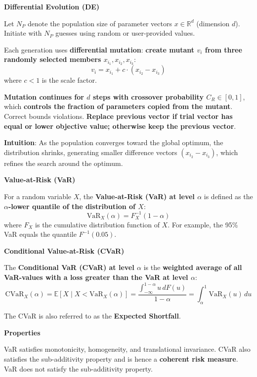 \documentclass[12pt,a4paper]{article}
\begin{document}
\vspace{0.5em}

\textbf{Differential Evolution (DE)}

Let $N_P$ denote the population size of parameter vectors $x \in \mathbb{R}^d$ (dimension $d$). Initiate with $N_P$ guesses using random or user-provided values.

Each generation uses \textbf{differential mutation}: \textbf{create mutant $v_i$ from three randomly selected members $x_{i_1}, x_{i_2}, x_{i_3}$}:
\[
v_i = x_{i_1} + c \cdot (x_{i_2} - x_{i_3})
\]
where $c < 1$ is the scale factor.

\textbf{Mutation continues for $d$ steps with crossover probability $C_R \in [0,1]$}, which \textbf{controls the fraction of parameters copied from the mutant}. Correct bounds violations. \textbf{Replace previous vector if trial vector has equal or lower objective value; otherwise keep the previous vector}.

\vspace{0.5em}

\textbf{Intuition}: As the population converges toward the global optimum, the distribution shrinks, generating smaller difference vectors $(x_{i_2} - x_{i_3})$, which refines the search around the optimum.

\vspace{0.5em}

\textbf{Value-at-Risk (VaR)}

For a random variable $X$, the \textbf{Value-at-Risk (VaR) at level $\alpha$} is defined as the \textbf{$\alpha$-lower quantile of the distribution of $X$}:
\[
\text{VaR}_X(\alpha) = F_X^{-1}(1 - \alpha)
\]
where $F_X$ is the cumulative distribution function of $X$. For example, the 95\% VaR equals the quantile $F^{-1}(0.05)$.

\textbf{Conditional Value-at-Risk (CVaR)}

The \textbf{Conditional VaR (CVaR) at level $\alpha$} is the \textbf{weighted average of all VaR-values with a loss greater than the VaR at level $\alpha$}:
\[
\text{CVaR}_X(\alpha) = \mathbb{E}[X \mid X < \text{VaR}_X(\alpha)] = \frac{\int_{-\infty}^{1-\alpha} u \, dF(u)}{1 - \alpha} = \int_{\alpha}^{1} \text{VaR}_X(u) \, du
\]

The CVaR is also referred to as the \textbf{Expected Shortfall}.

\vspace{0.5em}

\textbf{Properties}

VaR satisfies monotonicity, homogeneity, and translational invariance. CVaR also satisfies the sub-additivity property and is hence a \textbf{coherent risk measure}. VaR does not satisfy the sub-additivity property.
\end{document}
